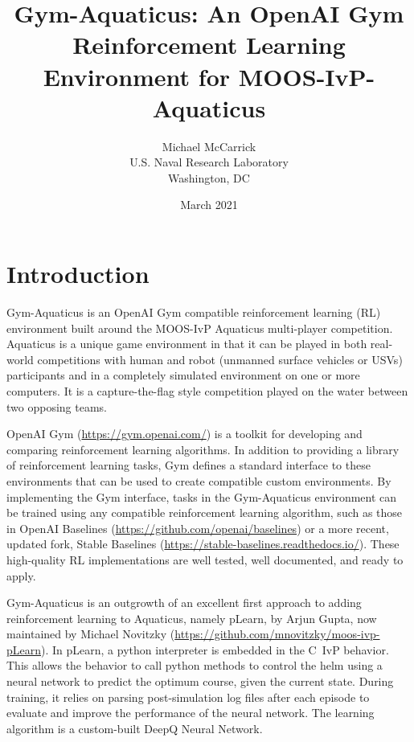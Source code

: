 \documentclass[onecolumn,letterpaper,11pt]{article}
\newcommand{\Cpp}{C\nolinebreak\hspace{-.05em}\raisebox{.4ex}{\tiny\bf +}\nolinebreak\hspace{-.10em}\raisebox{.4ex}{\tiny\bf +}}
\begin{document}
\title{
  Gym-Aquaticus: An OpenAI Gym Reinforcement Learning Environment
  for MOOS-IvP-Aquaticus}
\author{
  Michael McCarrick\\
  U.S. Naval Research Laboratory\\
  Washington, DC}
\date{March 2021}
\maketitle
\vspace{1in}

\tableofcontents
\newpage

\section{Introduction}

Gym-Aquaticus is an OpenAI Gym compatible reinforcement learning (RL)
environment built around the MOOS-IvP Aquaticus multi-player
competition. Aquaticus is a unique game environment in that it can be
played in both real-world competitions with human and robot (unmanned
surface vehicles or USVs) participants and in a completely simulated
environment on one or more computers. It is a capture-the-flag style
competition played on the water between two opposing teams.

OpenAI Gym (\url{https://gym.openai.com/}) is a toolkit for developing
and comparing reinforcement learning algorithms. In addition to
providing a library of reinforcement learning tasks, Gym defines a
standard interface to these environments that can be used to create
compatible custom environments. By implementing the Gym interface,
tasks in the Gym-Aquaticus environment can be trained using any
compatible reinforcement learning algorithm, such as those in OpenAI
Baselines (\url{https://github.com/openai/baselines}) or a more
recent, updated fork, Stable Baselines
(\url{https://stable-baselines.readthedocs.io/}).  These high-quality
RL implementations are well tested, well documented, and ready to
apply.

Gym-Aquaticus is an outgrowth of an excellent first approach to adding
reinforcement learning to Aquaticus, namely pLearn, by Arjun Gupta,
now maintained by Michael Novitzky
(\url{https://github.com/mnovitzky/moos-ivp-pLearn}). In pLearn, a
python interpreter is embedded in the \Cpp\ IvP behavior. This allows
the behavior to call python methods to control the helm using a neural
network to predict the optimum course, given the current state. During
training, it relies on parsing post-simulation log files after each
episode to evaluate and improve the performance of the neural
network. The learning algorithm is a custom-built DeepQ Neural
Network.
\end{document}
